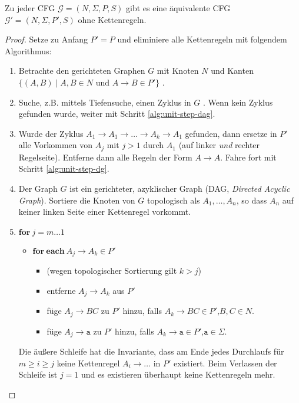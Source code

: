 \begin{lemma}
  Zu jeder CFG $\mathcal{G} = (N, \Sigma, P, S)$ gibt es eine äquivalente CFG $\mathcal{G}' = (N, \Sigma, P', S)$ ohne Kettenregeln.
\end{lemma}
\begin{proof}
  Setze zu Anfang $P' = P$ und eliminiere alle Kettenregeln mit folgendem Algorithmus:
  \begin{enumerate}
  \item Betrachte den gerichteten Graphen $G$ mit Knoten $N$ und Kanten $\{(A, B) \mid A,B \in N \text{ und } A \to B \in P' \}$ \label{alg:unit-step-dg}.
  \item Suche, z.B. mittels Tiefensuche, einen Zyklus in $G$ .
    Wenn kein Zyklus gefunden wurde, weiter mit Schritt \ref{alg:unit-step-dag}.
  \item Wurde der Zyklus $A_1 \to A_1 \to \ldots \to A_k \to A_1$ gefunden, dann ersetze in $P'$ alle Vorkommen von $A_j$ mit $j > 1$ durch $A_1$ (auf linker \emph{und} rechter Regelseite).
    Entferne dann alle Regeln der Form $A \to A$.
    Fahre fort mit Schritt \ref{alg:unit-step-dg}.
  \item \label{alg:unit-step-dag}
    Der Graph $G$ ist ein gerichteter, azyklischer Graph (DAG, \emph{Directed Acyclic Graph}).
    Sortiere die Knoten von $G$ topologisch als $A_1, \ldots, A_n$, so dass $A_n$ auf keiner linken Seite einer Kettenregel vorkommt.
  \item $\mathbf{for}~j = m \ldots 1$
    \begin{itemize}
    \item[] $\mathbf{for}~\mathbf{each}~A_j \to A_k \in P'$
      \begin{itemize}
      \item[] (wegen topologischer Sortierung gilt $k > j$)
      \item[] entferne $A_j \to A_k$ aus $P'$
      \item[] füge $A_j \to BC$ zu $P'$ hinzu, falls $A_k \to BC \in P'$,\quad $B,C \in N$.
      \item[] füge $A_j \to \mathtt{a}$ zu $P'$ hinzu, falls $A_k \to \mathtt{a} \in P'$,\quad $\mathtt{a} \in \Sigma$.
      \end{itemize}
    \end{itemize}
    Die äußere Schleife hat die Invariante, dass am Ende jedes Durchlaufs für $m \ge i \ge j$ keine Kettenregel $A_i \to \ldots$ in $P'$ existiert.
    Beim Verlassen der Schleife ist $j = 1$ und es existieren überhaupt keine Kettenregeln mehr.
  \end{enumerate}
\end{proof}


